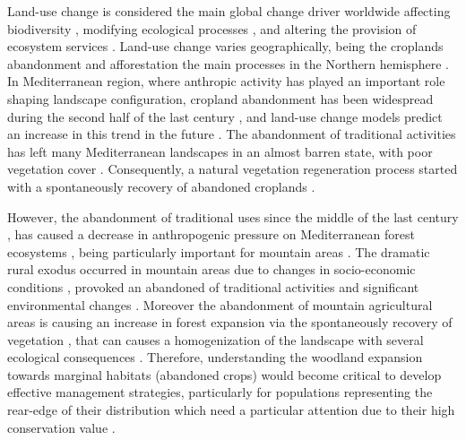 Land-use change is considered the main global change driver worldwide \autocites{Butchartetal2010GlobalBiodiversity,Winkleretal2021GlobalLand} affecting biodiversity \autocites{Sala2000GlobalBiodiversity}, modifying ecological processes \autocites{Lindenmayeretal2012LandUse}, and altering the provision of ecosystem services \autocites{Hasanetal2020ImpactLand}. Land-use change varies geographically, being the croplands abandonment and afforestation the main processes in the Northern hemisphere \autocites{Winkleretal2021GlobalLand,ReyBenayas2007AbandonmentAgricultural}. In Mediterranean region, where anthropic activity has played an important role shaping landscape configuration, cropland abandonment has been widespread during the second half of the last century \autocites{Piasetal2014ColonizationAbandoned,ValbuenaCarabanaetal2010HistoricalRecent,MartinezFernandezetal2015RecentLand}, and land-use change models predict an increase in this trend in the future \autocites{Rounsevelletal2006CoherentSet,PerpinaCastilloetal2021ModellingAgricultural}. The abandonment of traditional activities has left many Mediterranean landscapes in an almost barren state, with poor vegetation cover \autocites{Sheffer2012ReviewDevelopment, ReyBenayas2007AbandonmentAgricultural}. Consequently, a natural vegetation regeneration process started with a spontaneously recovery of abandoned croplands \autocites{Debusscheetal1999MediterraneanLandscape,PenuelasBoada2003GlobalChangeinduced,AlvarezMartinezetal2014InfluenceLand,Nataleetal2007StudyTree,Piussi2000ExpansionEuropean}. 

However, the abandonment of traditional uses since the middle of the last century \autocites{MacDonaldetal2000AgriculturalAbandonment}, has caused a decrease in anthropogenic pressure on Mediterranean forest ecosystems \autocites{ValbuenaCarabanaetal2010HistoricalRecent}, being particularly important for mountain areas \autocites{Nataleetal2007StudyTree, AlvarezMartinezetal2014InfluenceLand,JimenezOlivenciaetal2015MedioSiglo,Piasetal2014ColonizationAbandoned}. The dramatic rural exodus occurred in mountain areas due to changes in socio-economic conditions \autocites{EuropeanEnvironmentAgency2010EuropeEcological}, provoked an abandoned of traditional activities and significant environmental changes \autocites{MacDonaldetal2000AgriculturalAbandonment, Nataleetal2007StudyTree, AlvarezMartinezetal2014InfluenceLand,Piussi2000ExpansionEuropean,Rutherfordetal2008AssessingLanduse,Zimmermannetal2010EffectsLanduse}. Moreover the abandonment of mountain agricultural areas is causing an increase in forest expansion via the spontaneously recovery of vegetation \autocites{Piussi2000ExpansionEuropean, AlvarezMartinezetal2014InfluenceLand}, that can causes a homogenization of the landscape \autocites{Mietkiewiczetal2017LongtermChange} with several ecological consequences \autocites{Zimmermannetal2010EffectsLanduse}. Therefore, understanding the woodland expansion towards marginal habitats (abandoned crops) would become critical to develop effective management strategies, particularly for populations representing the rear-edge of their distribution \autocite{HampePetit2005ConservingBiodiversity} which need a particular attention due to their high conservation value \autocite{Fadyetal2016EvolutionbasedApproach}. 

